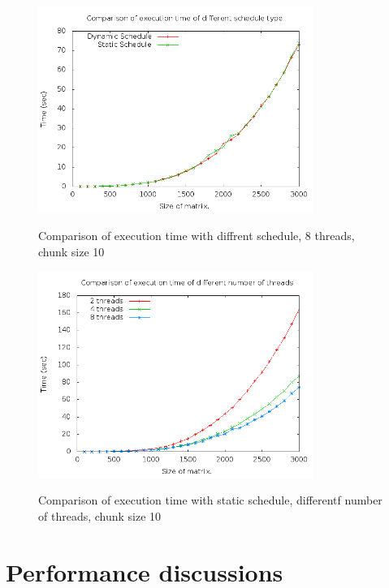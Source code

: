 \documentclass{article}
\begin{document}
    \begin{figure}[th!]
        \centering
        \includegraphics[width=0.8\textwidth]{ck10_8_trsm.png}
        \label{fig:10}
        \caption{Comparison of execution time with diffrent schedule, 8 threads, chunk size 10}
    \end{figure}

    \begin{figure}[th!]
        \centering
        \includegraphics[width=0.8\textwidth]{static_ck10_trsm.png}
        \label{fig:11}
        \caption{Comparison of execution time with static schedule, differentf number of threads, chunk size 10}
    \end{figure}

\newpage
\newpage
\section{Performance discussions}
\end{document}
